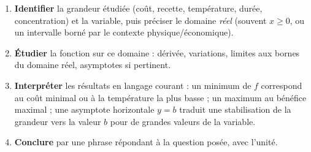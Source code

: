 \documentclass[11pt]{article}
\newcommand{\cle}[1]{{\popxbold\color{popdark}#1}}
\begin{document}
\begin{methode}
\begin{enumerate}
\item \textbf{Identifier} la grandeur étudiée (coût, recette, température, durée, concentration) et la variable, puis préciser le domaine \emph{réel} (souvent $x\geq 0$, ou un intervalle borné par le contexte physique/économique).
\item \textbf{Étudier} la fonction sur ce domaine : dérivée, variations, limites aux bornes du domaine réel, asymptotes si pertinent.
\item \textbf{Interpréter} les résultats en langage courant : un minimum de $f$ correspond au coût minimal ou à la température la plus basse ; un maximum au bénéfice maximal ; une asymptote horizontale $y=b$ traduit une \cle{stabilisation} de la grandeur vers la valeur $b$ pour de grandes valeurs de la variable.
\item \textbf{Conclure} par une phrase répondant à la question posée, avec l'unité.
\end{enumerate}
\end{methode}
\end{document}
